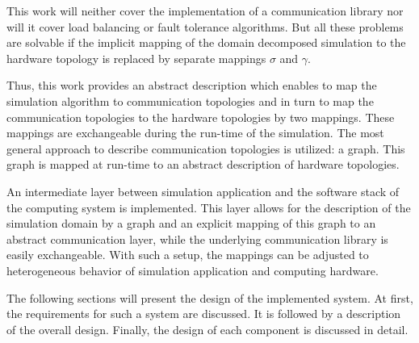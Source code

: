 This work will neither cover the implementation of a communication
library nor will it cover load balancing or fault tolerance
algorithms. But all these problems are solvable if the implicit
mapping of the domain decomposed simulation to the hardware topology
is replaced by separate mappings $\sigma$ and $\gamma$.

Thus, this work provides an abstract description which enables to map
the simulation algorithm to communication topologies and in turn to
map the communication topologies to the hardware topologies by two
mappings. These mappings are exchangeable during the run-time of the
simulation. The most general approach to describe communication
topologies is utilized: a graph. This graph is mapped at run-time
to an abstract description of hardware topologies.

An intermediate layer between simulation application and the software
stack of the computing system is implemented. This layer allows for
the description of the simulation domain by a graph and an explicit
mapping of this graph to an abstract communication layer, while the
underlying communication library is easily exchangeable. With such a
setup, the mappings can be adjusted to heterogeneous behavior of
simulation application and computing hardware.

The following sections will present the design of the implemented
system. At first, the requirements for such a system are discussed. It
is followed by a description of the overall design. Finally, the
design of each component is discussed in detail.



